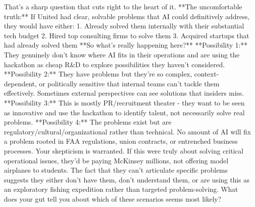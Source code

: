 \begin{botresponse}
That's a sharp question that cuts right to the heart of it.
**The uncomfortable truth:** If United had clear, solvable problems that AI could definitively address, they would have either:
1.  Already solved them internally with their substantial tech budget
2.  Hired top consulting firms to solve them
3.  Acquired startups that had already solved them
**So what's really happening here?**
**Possibility 1:** They genuinely don't know where AI fits in their operations and are using the hackathon as cheap R\&D to explore possibilities they haven't considered.
**Possibility 2:** They have problems but they're so complex, context-dependent, or politically sensitive that internal teams can't tackle them effectively. Sometimes external perspectives can see solutions that insiders miss.
**Possibility 3:** This is mostly PR/recruitment theater - they want to be seen as innovative and use the hackathon to identify talent, not necessarily solve real problems.
**Possibility 4:** The problems exist but are regulatory/cultural/organizational rather than technical. No amount of AI will fix a problem rooted in FAA regulations, union contracts, or entrenched business processes.
Your skepticism is warranted. If this were truly about solving critical operational issues, they'd be paying McKinsey millions, not offering model airplanes to students.
The fact that they can't articulate specific problems suggests they either don't have them, don't understand them, or are using this as an exploratory fishing expedition rather than targeted problem-solving.
What does your gut tell you about which of these scenarios seems most likely?
\end{botresponse}

